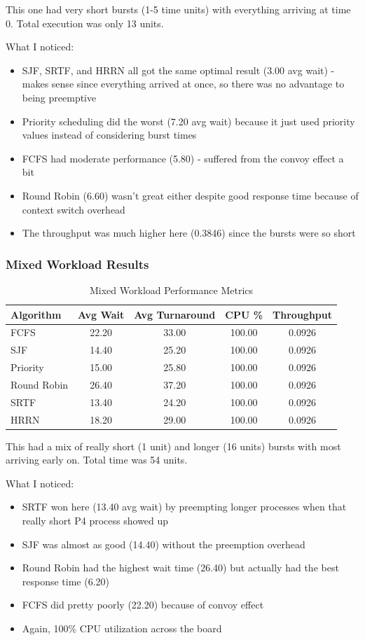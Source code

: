 \documentclass[12pt,letterpaper]{article}
\begin{document}
This one had very short bursts (1-5 time units) with everything arriving at time 
0. Total execution was only 13 units.

What I noticed:
\begin{itemize}
    \item SJF, SRTF, and HRRN all got the same optimal result (3.00 avg wait) - 
    makes sense since everything arrived at once, so there was no advantage to 
    being preemptive
    \item Priority scheduling did the worst (7.20 avg wait) because it just used 
    priority values instead of considering burst times
    \item FCFS had moderate performance (5.80) - suffered from the convoy effect 
    a bit
    \item Round Robin (6.60) wasn't great either despite good response time because 
    of context switch overhead
    \item The throughput was much higher here (0.3846) since the bursts were so short
\end{itemize}

\subsubsection{Mixed Workload Results}

\begin{table}[H]
\centering
\caption{Mixed Workload Performance Metrics}
\begin{tabular}{@{}lcccc@{}}
\toprule
\textbf{Algorithm} & \textbf{Avg Wait} & \textbf{Avg Turnaround} & \textbf{CPU \%} & \textbf{Throughput} \\ \midrule
FCFS & 22.20 & 33.00 & 100.00 & 0.0926 \\
SJF & 14.40 & 25.20 & 100.00 & 0.0926 \\
Priority & 15.00 & 25.80 & 100.00 & 0.0926 \\
Round Robin & 26.40 & 37.20 & 100.00 & 0.0926 \\
SRTF & 13.40 & 24.20 & 100.00 & 0.0926 \\
HRRN & 18.20 & 29.00 & 100.00 & 0.0926 \\ \bottomrule
\end{tabular}
\end{table}

This had a mix of really short (1 unit) and longer (16 units) bursts with most 
arriving early on. Total time was 54 units.

What I noticed:
\begin{itemize}
    \item SRTF won here (13.40 avg wait) by preempting longer processes when that 
    really short P4 process showed up
    \item SJF was almost as good (14.40) without the preemption overhead
    \item Round Robin had the highest wait time (26.40) but actually had the best 
    response time (6.20)
    \item FCFS did pretty poorly (22.20) because of convoy effect
    \item Again, 100\% CPU utilization across the board
\end{itemize}
\end{document}
